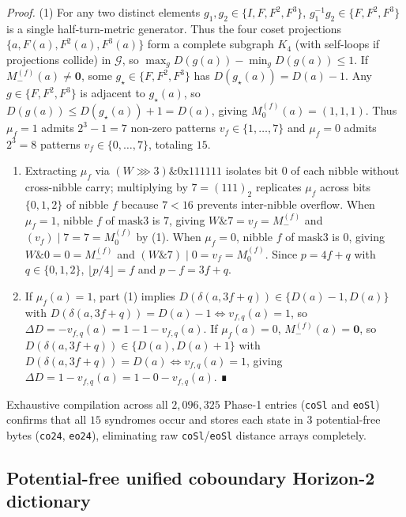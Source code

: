 \documentclass[10pt,twocolumn,letterpaper]{article}
\begin{document}
\emph{Proof.} (1) For any two distinct elements
\(g_1, g_2 \in \{I, F, F^2, F^3\}\), \(g_1^{-1}g_2 \in \{F, F^2, F^3\}\)
is a single half-turn-metric generator. Thus the four coset projections
\(\{a, F(a), F^2(a), F^3(a)\}\) form a complete subgraph \(K_4\) (with
self-loops if projections collide) in \(\mathcal G\), so
\(\max_g D(g(a)) - \min_g D(g(a)) \le 1\). If
\(M_-^{(f)}(a) \ne \mathbf{0}\), some \(g_\star \in \{F,F^2,F^3\}\) has
\(D(g_\star(a)) = D(a)-1\). Any \(g \in \{F,F^2,F^3\}\) is adjacent to
\(g_\star(a)\), so \(D(g(a)) \le D(g_\star(a)) + 1 = D(a)\), giving
\(M_0^{(f)}(a) = (1,1,1)\). Thus \(\mu_f=1\) admits \(2^3-1=7\) non-zero
patterns \(v_f \in \{1,\dots,7\}\) and \(\mu_f=0\) admits \(2^3=8\)
patterns \(v_f \in \{0,\dots,7\}\), totaling \(15\).

\begin{enumerate}
\def\labelenumi{(\arabic{enumi})}
\setcounter{enumi}{1}
\item
  Extracting \(\mu_f\) via \((W\ggg 3)\mathbin{\&}\text{0x111111}\)
  isolates bit \(0\) of each nibble without cross-nibble carry;
  multiplying by \(7 = (111)_2\) replicates \(\mu_f\) across bits
  \(\{0,1,2\}\) of nibble \(f\) because \(7 < 16\) prevents inter-nibble
  overflow. When \(\mu_f=1\), nibble \(f\) of \(\text{mask3}\) is \(7\),
  giving \(W\mathbin{\&}7 = v_f = M_-^{(f)}\) and
  \((v_f)\mathbin{|}7 = 7 = M_0^{(f)}\) by (1). When \(\mu_f=0\), nibble
  \(f\) of \(\text{mask3}\) is \(0\), giving
  \(W\mathbin{\&}0 = 0 = M_-^{(f)}\) and
  \((W\mathbin{\&}7)\mathbin{|}0 = v_f = M_0^{(f)}\). Since
  \(p = 4f + q\) with \(q \in \{0,1,2\}\), \(\lfloor p/4 \rfloor = f\)
  and \(p - f = 3f + q\).
\item
  If \(\mu_f(a)=1\), part (1) implies
  \(D(\delta(a,3f+q)) \in \{D(a)-1, D(a)\}\) with
  \(D(\delta(a,3f+q)) = D(a)-1 \iff v_{f,q}(a)=1\), so
  \(\Delta D = -v_{f,q}(a) = 1 - 1 - v_{f,q}(a)\). If \(\mu_f(a)=0\),
  \(M_-^{(f)}(a)=\mathbf{0}\), so
  \(D(\delta(a,3f+q)) \in \{D(a), D(a)+1\}\) with
  \(D(\delta(a,3f+q)) = D(a) \iff v_{f,q}(a)=1\), giving
  \(\Delta D = 1 - v_{f,q}(a) = 1 - 0 - v_{f,q}(a)\). ∎
\end{enumerate}

Exhaustive compilation across all \(2,096,325\) Phase-1 entries
(\texttt{coSl} and \texttt{eoSl}) confirms that all \(15\) syndromes
occur and stores each state in 3 potential-free bytes (\texttt{co24},
\texttt{eo24}), eliminating raw \texttt{coSl}/\texttt{eoSl} distance
arrays completely.

\hypertarget{potential-free-unified-coboundary-horizon-2-dictionary}{%
\subsection{Potential-free unified coboundary Horizon-2 dictionary}\label{potential-free-unified-coboundary-horizon-2-dictionary}}
\end{document}
